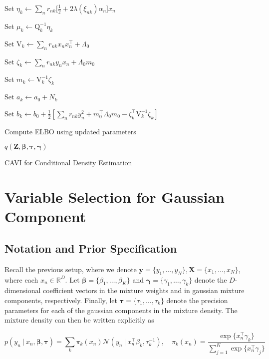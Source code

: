 \documentclass[twoside,11pt]{article}
\newcommand\given[1][]{\:#1\vert\:}
\newcommand{\transpose}[1]{#1^{\intercal}}
\newcommand{\R}{\mathbb{R}}
\newcommand{\nsum}{\sum\limits_{n}}
\newcommand{\ksum}{\sum\limits_{k}}
\newcommand{\boldbeta}{\boldsymbol\beta}
\newcommand{\boldgamma}{\boldsymbol\gamma}
\newcommand{\boldtau}{\boldsymbol\tau}
\newcommand{\pr}[1]{p \left( #1 \right)}
\begin{document}
\begin{algorithm}[H]
{{   Set $\eta_k \leftarrow \sum_{n} r_{nk} \big[ \frac{1}{2} + 2\lambda(\xi_{nk}) \alpha_n \big]x_n$\; %
         
   Set $\mu_k \leftarrow \mathrm{Q}_k^{-1} \eta_k$\; %
   
   Set $\mathrm{V}_k \leftarrow \nsum r_{nk} x_n \transpose{x_n} + \Lambda_0$ \; %
   
   Set $\zeta_k \leftarrow \sum_{n} r_{nk} y_n x_n + \Lambda_0 m_0$\; %
   
   Set $m_k \leftarrow \mathrm{V}_k^{-1} \zeta_k$\; %
   
   Set $a_k \leftarrow a_0 + N_k$\; %
   
   Set $b_k \leftarrow b_0 + \frac{1}{2}[\nsum r_{nk} y_n^2 + \transpose{m_0}\Lambda_0 m_0 - \transpose{\zeta_k} \mathrm{V}_k^{-1} \zeta_k]$\; %
   }
   Compute ELBO using updated parameters
 } %
 \Return $q \left( \mathbf{Z}, \boldbeta, \boldtau, \boldgamma \right)$
 \caption{CAVI for Conditional Density Estimation}
\end{algorithm}


\section{Variable Selection for Gaussian Component} \label{vs}  %


\subsection{Notation and Prior Specification}
Recall the previous setup, where we denote $\mathbf{y} = \{y_1, \ldots, y_N \}, \mathbf{X} = \{ x_1, \ldots, x_N \}$, where each $x_n \in \R^{D}$. Let $\boldbeta = \{ \beta_1, \ldots, \beta_K\}$ and $\boldgamma = \{ \gamma_1, \ldots, \gamma_k\}$ denote the $D$-dimensional coefficient vectors  in the mixture weights and in gaussian mixture components, respectively. Finally, let $\boldtau = \{ \tau_1, \ldots, \tau_k \}$ denote the precision parameters for each of the gaussian components in the mixture density. The mixture density can then be written explicitly as

\begin{equation} 
	 \pr{y_n \given x_n, \boldbeta, \boldtau} = \ksum \pi_k(x_n) \mathcal{N} \left( y_n \given \transpose{x_n}\beta_k, \tau_k^{-1} \right), \quad \pi_k(x_n) = \frac{\exp\{\transpose{x_n} \gamma_k\}}{\sum\limits_{j=1}^{K} \exp\{ \transpose{x_n} \gamma_j\}}
\end{equation}
\end{document}
